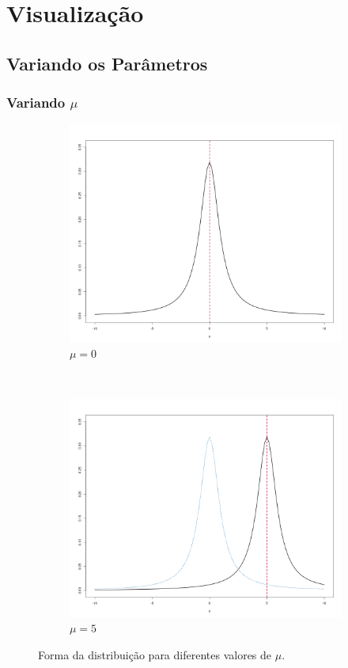 \documentclass[13pt, aspectratio=169]{beamer}
\begin{document}
\section{Visualização}
\subsection{Variando os Parâmetros}

\begin{frame}
    \frametitle{Variando $\mu$}

    \begin{figure}[!ht]
        \centering
        \begin{subfigure}[t]{0.43\textwidth}
            \centering
            \includegraphics[width=\textwidth]{images/variando_mu_1.png}
            \caption{$\mu = 0$}
        \end{subfigure}%
        ~
        \begin{subfigure}[t]{0.43\textwidth}
            \centering
            \includegraphics[width=\textwidth]{images/variando_mu_2.png}
            \caption{$\mu = 5$}
        \end{subfigure}%
        \caption{Forma da distribuição para diferentes valores de $\mu$.}
    \end{figure}


\end{frame}
\end{document}
